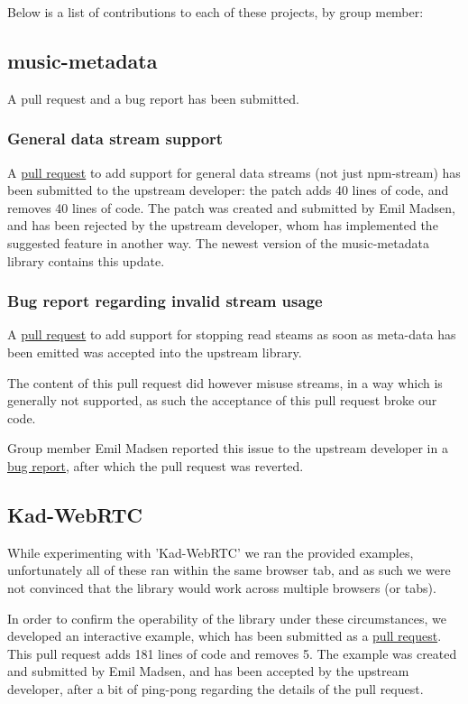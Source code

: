 Below is a list of contributions to each of these projects, by group member:
\subsection{music-metadata}
A pull request and a bug report has been submitted.

\subsubsection{General data stream support}
A \href{https://github.com/leetreveil/musicmetadata/pull/114}{pull request} to
add support for general data streams (not just npm-stream) has been submitted
to the upstream developer: the patch adds 40 lines of code, and removes 40
lines of code.
\newline\newline
The patch was created and submitted by Emil Madsen, and has been rejected by
the upstream developer, whom has implemented the suggested feature in another
way. The newest version of the music-metadata library contains this update.

\subsubsection{Bug report regarding invalid stream usage}
A \href{https://github.com/leetreveil/musicmetadata/pull/116}{pull request} to
add support for stopping read steams as soon as meta-data has been emitted was
accepted into the upstream library.

The content of this pull request did however misuse streams, in a way which is
generally not supported, as such the acceptance of this pull request broke our
code.

Group member Emil Madsen reported this issue to the upstream developer in a
\href{https://github.com/leetreveil/musicmetadata/issues/120}{bug report},
after which the pull request was reverted.

\subsection{Kad-WebRTC}
\label{subsec:appendix-kad-webrtc}
While experimenting with 'Kad-WebRTC' we ran the provided examples, 
unfortunately all of these ran within the same browser tab, and as such we were
not convinced that the library would work across multiple browsers (or tabs).

In order to confirm the operability of the library under these circumstances,
we developed an interactive example, which has been submitted as a 
\href{https://github.com/kadtools/kad-webrtc/pull/11}{pull request}. This pull
request adds 181 lines of code and removes 5.
\newline\newline
The example was created and submitted by Emil Madsen, and has been accepted by
the upstream developer, after a bit of ping-pong regarding the details of the 
pull request.

